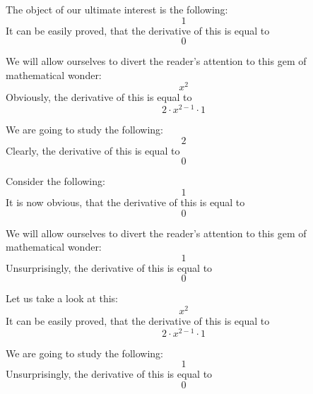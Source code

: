 \documentclass{article}
\begin{document}
The object of our ultimate interest is the following:
\begin{equation}
1 
\end{equation}
It can be easily proved, that the derivative of this is equal to
\begin{equation}
0 
\end{equation}

We will allow ourselves to divert the reader's attention to this gem of mathematical wonder:
\begin{equation}
x ^{2 } 
\end{equation}
Obviously, the derivative of this is equal to
\begin{equation}
2 \cdot x ^{2 - 1 } \cdot 1 
\end{equation}

We are going to study the following:
\begin{equation}
2 
\end{equation}
Clearly, the derivative of this is equal to
\begin{equation}
0 
\end{equation}

Consider the following:
\begin{equation}
1 
\end{equation}
It is now obvious, that the derivative of this is equal to
\begin{equation}
0 
\end{equation}

We will allow ourselves to divert the reader's attention to this gem of mathematical wonder:
\begin{equation}
1 
\end{equation}
Unsurprisingly, the derivative of this is equal to
\begin{equation}
0 
\end{equation}

Let us take a look at this:
\begin{equation}
x ^{2 } 
\end{equation}
It can be easily proved, that the derivative of this is equal to
\begin{equation}
2 \cdot x ^{2 - 1 } \cdot 1 
\end{equation}

We are going to study the following:
\begin{equation}
1 
\end{equation}
Unsurprisingly, the derivative of this is equal to
\begin{equation}
0 
\end{equation}
\end{document}
